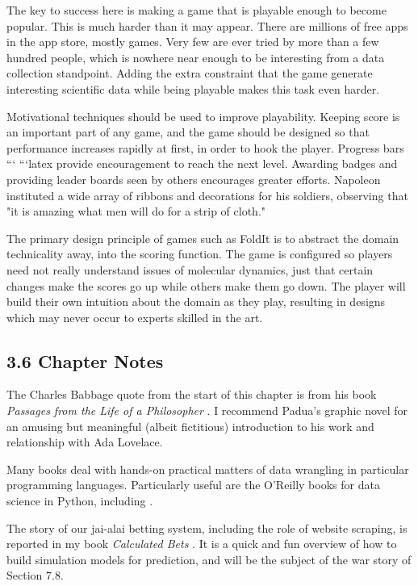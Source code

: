\documentclass[10pt]{article}
\begin{document}
The key to success here is making a game that is playable enough to become popular. This is much harder than it may appear. There are millions of free apps in the app store, mostly games. Very few are ever tried by more than a few hundred people, which is nowhere near enough to be interesting from a data collection standpoint. Adding the extra constraint that the game generate interesting scientific data while being playable makes this task even harder.

Motivational techniques should be used to improve playability. Keeping score is an important part of any game, and the game should be designed so that performance increases rapidly at first, in order to hook the player. Progress bars
```
```latex
provide encouragement to reach the next level. Awarding badges and providing leader boards seen by others encourages greater efforts. Napoleon instituted a wide array of ribbons and decorations for his soldiers, observing that "it is amazing what men will do for a strip of cloth."

The primary design principle of games such as FoldIt is to abstract the domain technicality away, into the scoring function. The game is configured so players need not really understand issues of molecular dynamics, just that certain changes make the scores go up while others make them go down. The player will build their own intuition about the domain as they play, resulting in designs which may never occur to experts skilled in the art.

\subsection*{3.6 Chapter Notes}
The Charles Babbage quote from the start of this chapter is from his book \textit{Passages from the Life of a Philosopher} \cite{Bab11}. I recommend Padua's graphic novel \cite{Pad15} for an amusing but meaningful (albeit fictitious) introduction to his work and relationship with Ada Lovelace.

Many books deal with hands-on practical matters of data wrangling in particular programming languages. Particularly useful are the O'Reilly books for data science in Python, including \cite{Gru15, McK12}.

The story of our jai-alai betting system, including the role of website scraping, is reported in my book \textit{Calculated Bets} \cite{Ski01}. It is a quick and fun overview of how to build simulation models for prediction, and will be the subject of the war story of Section 7.8.
\end{document}
